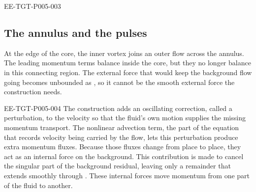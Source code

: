 \begin{EESegment}{EE-TGT-P005-003}
\subsection{The annulus and the pulses}\label{sec:2.2}
At the edge of the core, the inner vortex joins an outer flow across the annulus. The leading
momentum terms balance inside the core, but they no longer balance in this connecting region.
The external force that would keep the background flow going becomes unbounded as
, so it cannot be the smooth external force the construction
needs.
\end{EESegment}

\begin{EESegment}{EE-TGT-P005-004}
The construction adds an oscillating correction, called a perturbation, to the velocity so that
the fluid's own motion supplies the missing momentum transport. The nonlinear advection term,
the part of the equation that records velocity being carried by the flow, lets this perturbation
produce extra momentum fluxes. Because those fluxes change from place to place, they act as an
internal force on the background. This contribution is made to cancel the singular part of the
background residual, leaving only a remainder that extends smoothly through
. These internal forces move momentum from one part of the fluid to
another.
\end{EESegment}


